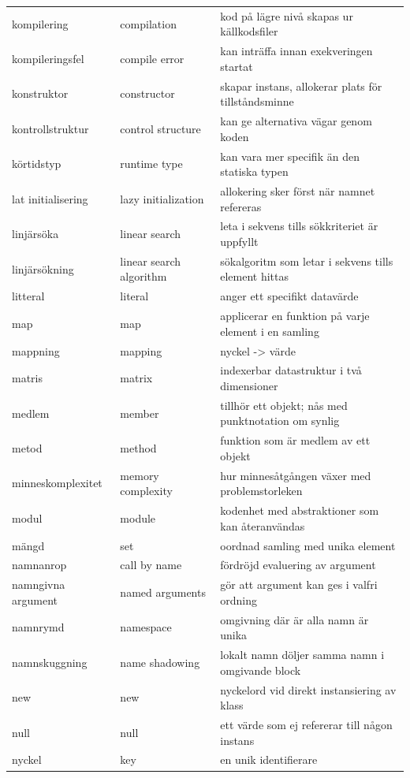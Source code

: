 \begin{tabular}{l|l|l}
kompilering & compilation & kod på lägre nivå skapas ur källkodsfiler \\
kompileringsfel & compile error & kan inträffa innan exekveringen startat \\
konstruktor & constructor & skapar instans, allokerar plats för tillståndsminne \\
kontrollstruktur & control structure & kan ge alternativa vägar genom koden \\
körtidstyp & runtime type & kan vara mer specifik än den statiska typen \\
lat initialisering & lazy initialization & allokering sker först när namnet refereras \\
linjärsöka & linear search & leta i sekvens tills sökkriteriet är uppfyllt \\
linjärsökning & linear search algorithm & sökalgoritm som letar i sekvens tills element hittas \\
litteral & literal & anger ett specifikt datavärde \\
map & map & applicerar en funktion på varje element i en samling \\
mappning & mapping & nyckel -> värde \\
matris & matrix & indexerbar datastruktur i två dimensioner \\
medlem & member & tillhör ett objekt; nås med punktnotation om synlig \\
metod & method & funktion som är medlem av ett objekt \\
minneskomplexitet & memory complexity & hur minnesåtgången växer med problemstorleken \\
modul & module & kodenhet med abstraktioner som kan återanvändas \\
mängd & set & oordnad samling med unika element \\
namnanrop & call by name & fördröjd evaluering av argument \\
namngivna argument & named arguments & gör att argument kan ges i valfri ordning \\
namnrymd & namespace & omgivning där är alla namn är unika \\
namnskuggning & name shadowing & lokalt namn döljer samma namn i omgivande block \\
new & new & nyckelord vid direkt instansiering av klass \\
null & null & ett värde som ej refererar till någon instans \\
nyckel & key & en unik identifierare \\

\end{tabular}
